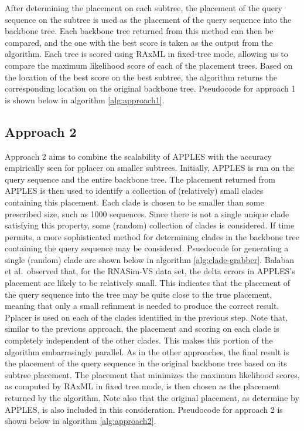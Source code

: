 \documentclass[10pt]{article}
\begin{document}
After determining the placement on each subtree, the placement of the
query sequence on the subtree is used as the placement of the query
sequence into the backbone tree. Each backbone tree returned from this
method can then be compared, and the one with the best score is taken as
the output from the algorithm. Each tree is scored using RAxML in
fixed-tree mode, allowing us to compare the maximum likelihood score of
each of the placement trees. Based on the location of the best score on
the best subtree, the algorithm returns the corresponding location on
the original backbone tree. Pseudocode for approach 1 is shown below in
algorithm \ref{alg:approach1}.

\subsection{Approach 2}

Approach 2 aims to combine the scalability of APPLES with the accuracy
empirically seen for pplacer on smaller subtrees. Initially, APPLES is
run on the query sequence and the entire backbone tree. The placement
returned from APPLES is then used to identify a collection of
(relatively) small clades containing this placement. Each clade is
chosen to be smaller than some prescribed size, such as 1000 sequences.
Since there is not a single unique clade satisfying this property, some
(random) collection of clades is considered. If time permits, a more
sophisticated method for determining clades in the backbone tree
containing the query sequence may be considered. Psuedocode for
generating a single (random) clade are shown below in algorithm
\ref{alg:clade-grabber}. Balaban et al.~observed that, for the RNASim-VS
data set, the delta errors in APPLES's placement are likely to be
relatively small. This indicates that the placement of the query
sequence into the tree may be quite close to the true placement, meaning
that only a small refinment is needed to produce the correct result.
Pplacer is used on each of the clades identified in the previous step.
Note that, similar to the previous approach, the placement and scoring
on each clade is completely independent of the other clades. This makes
this portion of the algorithm embarrasingly parallel. As in the other
approaches, the final result is the placement of the query sequence in
the original backbone tree based on its subtree placement. The placement
that minimizes the maximum likelihood scores, as computed by RAxML in
fixed tree mode, is then chosen as the placement returned by the
algorithm. Note also that the original placement, as determine by
APPLES, is also included in this consideration. Pseudocode for approach
2 is shown below in algorithm \ref{alg:approach2}.
\end{document}
